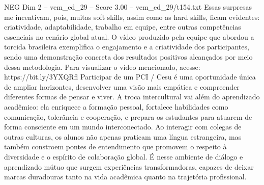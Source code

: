 \begin{textsample}{NEG Dim 2 – vem\_ed\_29 – Score 3.00 – vem\_ed\_29/t154.txt}
Essas surpresas me incentivam, pois, muitas soft skills, assim como as hard skills, ficam evidentes: criatividade, adaptabilidade, trabalho em equipe, entre outras competências essenciais no cenário global atual.
O vídeo produzido pela equipe que abordou a torcida brasileira exemplifica o engajamento e a criatividade dos participantes, sendo uma demonstração concreta dos resultados positivos alcançados por meio dessa metodologia.
Para visualizar o vídeo mencionado, acesse: https://bit.ly/3YXQRfl Participar de um PCI / Cesu é uma oportunidade única de ampliar horizontes, desenvolver uma visão mais empática e compreender diferentes formas de pensar e viver.
A troca intercultural vai além do aprendizado acadêmico: ela enriquece a formação pessoal, fortalece habilidades como comunicação, tolerância e cooperação, e prepara os estudantes para atuarem de forma consciente em um mundo interconectado.
Ao interagir com colegas de outras culturas, os alunos não apenas praticam uma língua estrangeira, mas também constroem pontes de entendimento que promovem o respeito à diversidade e o espírito de colaboração global.
É nesse ambiente de diálogo e aprendizado mútuo que surgem experiências transformadoras, capazes de deixar marcas duradouras tanto na vida acadêmica quanto na trajetória profissional.

\end{textsample}
